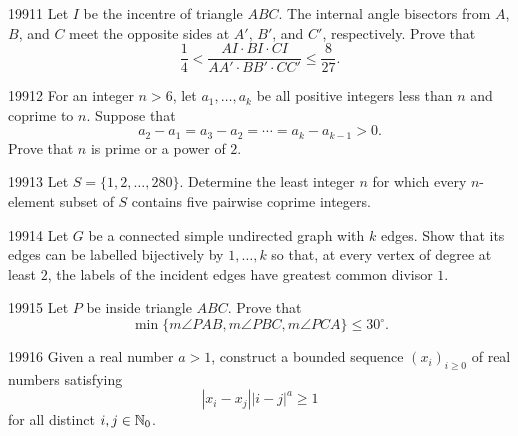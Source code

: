 
\begin{problem}{1991}{1}
Let $I$ be the incentre of triangle $ABC$. The internal angle bisectors from $A$, $B$, and $C$ meet the opposite sides at $A'$, $B'$, and $C'$, respectively. Prove that
\[
    \frac14<\frac{AI\cdot BI\cdot CI}{AA'\cdot BB'\cdot CC'}\leq\frac8{27}.
\]
\end{problem}

\begin{problem}{1991}{2}
For an integer $n>6$, let $a_1, \dots, a_k$ be all positive integers less than $n$ and coprime to $n$. Suppose that
\[
    a_2-a_1=a_3-a_2=\cdots=a_k-a_{k-1}>0.
\]
Prove that $n$ is prime or a power of $2$.
\end{problem}

\begin{problem}{1991}{3}
Let $S=\{1, 2, \dots, 280\}$. Determine the least integer $n$ for which every $n$-element subset of $S$ contains five pairwise coprime integers.
\end{problem}

\begin{problem}{1991}{4}
Let $G$ be a connected simple undirected graph with $k$ edges. Show that its edges can be labelled bijectively by $1, \dots, k$ so that, at every vertex of degree at least $2$, the labels of the incident edges have greatest common divisor $1$.
\end{problem}

\begin{problem}{1991}{5}
Let $P$ be inside triangle $ABC$. Prove that
\[
    \min\{m\angle PAB, m\angle PBC, m\angle PCA\}\leq30^\circ.
\]
\end{problem}

\begin{problem}{1991}{6}
Given a real number $a>1$, construct a bounded sequence $(x_i)_{i\geq0}$ of real numbers satisfying
\[
    |x_i-x_j||i-j|^a\geq1
\]
for all distinct $i, j\in\mathbb{N}_0$.
\end{problem}
